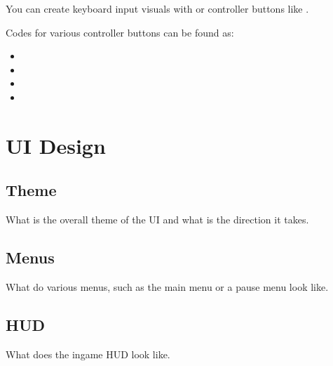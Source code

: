You can create keyboard input visuals with  or controller buttons like \controllerA.

Codes for various controller buttons can be found as:
\begin{itemize}
\item \controllerA \hspace{1pt} \texttt{\controllerA}
\item \controllerB \hspace{1pt} \texttt{\controllerB}
\item \controllerX \hspace{1pt} \texttt{\controllerX}
\item \controllerY \hspace{1pt} \texttt{\controllerY}
\end{itemize}

\section{UI Design}
\subsection{Theme}
What is the overall theme of the UI and what is the direction it takes.
\subsection{Menus}
What do various menus, such as the main menu or a pause menu look like.
\subsection{HUD}
What does the ingame HUD look like.


